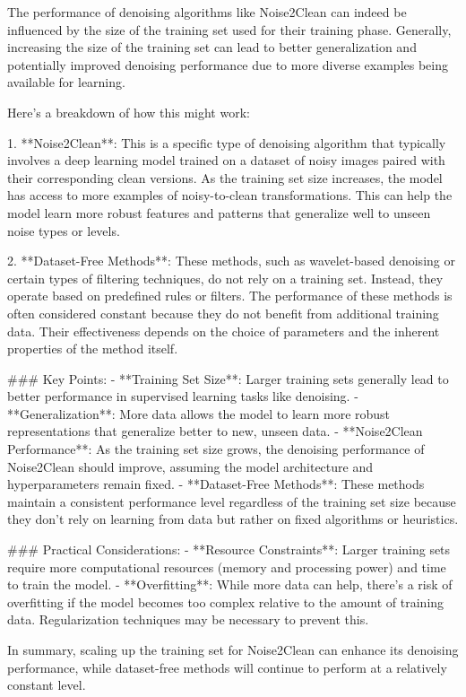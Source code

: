 The performance of denoising algorithms like Noise2Clean can indeed be influenced by the size of the training set used for their training phase. Generally, increasing the size of the training set can lead to better generalization and potentially improved denoising performance due to more diverse examples being available for learning.

Here's a breakdown of how this might work:

1. **Noise2Clean**: This is a specific type of denoising algorithm that typically involves a deep learning model trained on a dataset of noisy images paired with their corresponding clean versions. As the training set size increases, the model has access to more examples of noisy-to-clean transformations. This can help the model learn more robust features and patterns that generalize well to unseen noise types or levels.

2. **Dataset-Free Methods**: These methods, such as wavelet-based denoising or certain types of filtering techniques, do not rely on a training set. Instead, they operate based on predefined rules or filters. The performance of these methods is often considered constant because they do not benefit from additional training data. Their effectiveness depends on the choice of parameters and the inherent properties of the method itself.

### Key Points:
- **Training Set Size**: Larger training sets generally lead to better performance in supervised learning tasks like denoising.
- **Generalization**: More data allows the model to learn more robust representations that generalize better to new, unseen data.
- **Noise2Clean Performance**: As the training set size grows, the denoising performance of Noise2Clean should improve, assuming the model architecture and hyperparameters remain fixed.
- **Dataset-Free Methods**: These methods maintain a consistent performance level regardless of the training set size because they don't rely on learning from data but rather on fixed algorithms or heuristics.

### Practical Considerations:
- **Resource Constraints**: Larger training sets require more computational resources (memory and processing power) and time to train the model.
- **Overfitting**: While more data can help, there's a risk of overfitting if the model becomes too complex relative to the amount of training data. Regularization techniques may be necessary to prevent this.

In summary, scaling up the training set for Noise2Clean can enhance its denoising performance, while dataset-free methods will continue to perform at a relatively constant level.